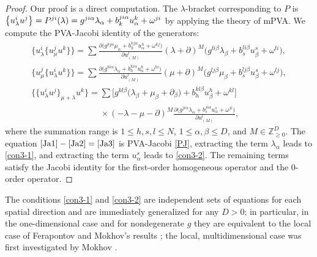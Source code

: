 \documentclass[10pt,a4paper]{amsart}
\numberwithin{equation}{section}
\begin{document}
\begin{proof}
Our proof is a direct computation. The $\lambda$-bracket corresponding to $P$ is $\big\lbrace u^i_{\lambda}u^j\big\rbrace=\smash{P^{ji}(\lambda)=g^{ji\alpha}\lambda_\alpha+b^{ji\alpha}_ku^k_\alpha+\omega^{ji}}$ by applying the theory of mPVA. We compute the PVA-Jacobi identity of the generators:
\begin{subequations}
\begin{gather}
\big\lbrace u^i_{\lambda}\big\lbrace u^j_{\mu} u^k\big\rbrace\big\rbrace=\sum\frac{\partial\big(g^{kj\alpha}\mu_\alpha+b^{kj\alpha}_hu^h_\alpha+\omega^{kj}\big)}{\partial u^l_{(M)}}(\lambda+\partial)^M\big(g^{li\beta}\lambda_\beta+b^{li\beta}_su^s_\beta+\omega^{li}\big),\label{Ja1}\\
\big\lbrace u^j_{\mu}\big\lbrace u^i_{\lambda} u^k\big\rbrace\big\rbrace=\sum\frac{\partial\big(g^{ki\alpha}\lambda_\alpha+b^{ki\alpha}_hu^h_\alpha+\omega^{ki}\big)}{\partial u^l_{(M)}}(\mu+\partial)^M\big(g^{lj\beta}\mu_\beta+b^{lj\beta}_su^s_\beta+\omega^{lj}\big),\label{Ja2}\\
\big\lbrace\big\lbrace u^i_{\lambda} u^j\big\rbrace_{\mu+\lambda}u^k\big\rbrace=\sum\big[g^{kl\beta} \big(\lambda_\beta+\mu_\beta+\partial_\beta\big)+b^{kl\beta}_hu^h_\beta+\omega^{kl}\big]\nonumber\\
\phantom{\big\lbrace\big\lbrace u^i_{\lambda} u^j\big\rbrace_{\mu+\lambda}u^k\big\rbrace=}{}\times(-\lambda-\mu-\partial)^M\frac{\partial\big(g^{ji\alpha} \lambda_\alpha+b^{ji\alpha}_su^s_\alpha+\omega^{ji}\big)}{\partial u^l_{(M)}},\label{Ja3}
\end{gather}
\end{subequations}
where the summation range is $1\leq h,s,l\leq N$, $1\leq\alpha,\beta\leq D$, and $M\in\mathbb{Z}^D_{\geq0}$. The equation $\eqref{Ja1}-\eqref{Ja2}=\eqref{Ja3}$ is PVA-Jacobi \eqref{PJ}, extracting the term $\lambda_\alpha$ leads to \eqref{con3-1}, and extracting the term $u^s_\alpha$ leads to \eqref{con3-2}. The remaining terms satisfy the Jacobi identity for the first-order homogeneous operator and the 0-order operator.
\end{proof}

\begin{Remark}
The conditions \eqref{con3-1} and \eqref{con3-2} are independent sets of equations for each spatial direction and are immediately generalized for any $D>0$; in particular, in the one-dimensional case and for nondegenerate $g$ they are equivalent to the local case of Ferapontov and Mokhov's results \cite{mokhov1994hamiltonian}; the local, multidimensional case was first investigated by Mokhov \cite{mokhov1995symplectic}.
\end{Remark}
\end{document}
